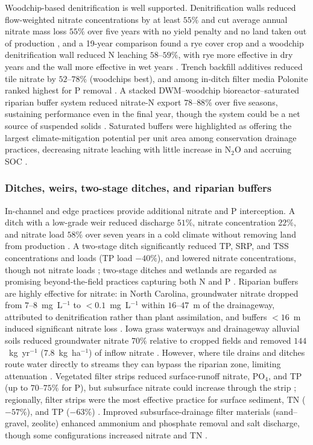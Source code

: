 Woodchip-based denitrification is well supported. Denitrification walls
reduced flow-weighted nitrate concentrations by at least $55\%$ and cut
average annual nitrate mass loss $55\%$ over five years with no yield
penalty and no land taken out of production \parencite{Jaynes2008}, and a
19-year comparison found a rye cover crop and a woodchip denitrification
wall reduced N leaching $58$--$59\%$, with rye more effective in dry years
and the wall more effective in wet years \parencite{Rogovska2023}. Trench
backfill additives reduced tile nitrate by $52$--$78\%$ (woodchips best),
and among in-ditch filter media Polonite ranked highest for P removal
\parencite{Povilaitis2018}. A stacked DWM--woodchip bioreactor--saturated
riparian buffer system reduced nitrate-N export $78$--$88\%$ over five
seasons, sustaining performance even in the final year, though the system
could be a net source of suspended solids \parencite{Singh2024b}. Saturated
buffers were highlighted as offering the largest climate-mitigation
potential per unit area among conservation drainage practices, decreasing
nitrate leaching with little increase in N$_2$O and accruing SOC
\parencite{Hall2025}.

\subsubsection{Ditches, weirs, two-stage ditches, and riparian buffers}

In-channel and edge practices provide additional nitrate and P
interception. A ditch with a low-grade weir reduced discharge $51\%$,
nitrate concentration $22\%$, and nitrate load $58\%$ over seven years in a
cold climate without removing land from production \parencite{Strock2025b}.
A two-stage ditch significantly reduced TP, SRP, and TSS concentrations and
loads (TP load $-40\%$), and lowered nitrate concentrations, though not
nitrate loads \parencite{Hodaj2017}; two-stage ditches and wetlands are
regarded as promising beyond-the-field practices capturing both N and P
\parencite{Kalcic2018}. Riparian buffers are highly effective for nitrate:
in North Carolina, groundwater nitrate dropped from $7$--$8$~mg~L$^{-1}$ to
$<0.1$~mg~L$^{-1}$ within $16$--$47$~m of the drainageway, attributed to
denitrification rather than plant assimilation, and buffers $<16$~m
induced significant nitrate loss \parencite{JACOBS1985}. Iowa grass
waterways and drainageway alluvial soils reduced groundwater nitrate $70\%$
relative to cropped fields and removed $144$~kg~yr$^{-1}$
($7.8$~kg~ha$^{-1}$) of inflow nitrate \parencite{Schilling2022}. However,
where tile drains and ditches route water directly to streams they can
bypass the riparian zone, limiting attenuation \parencite{Puckett2005}.
Vegetated filter strips reduced surface-runoff nitrate, PO$_4$, and TP (up
to $70$--$75\%$ for P), but subsurface nitrate could increase through the
strip \parencite{Bhattarai2009}; regionally, filter strips were the most
effective practice for surface sediment, TN ($-57\%$), and TP ($-63\%$)
\parencite{Yuan2022}. Improved subsurface-drainage filter materials
(sand--gravel, zeolite) enhanced ammonium and phosphate removal and salt
discharge, though some configurations increased nitrate and TN
\parencite{Tao2019b,Tao2022,Tao2025b,Wang2024e}.

